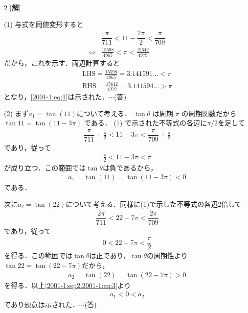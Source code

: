 \documentclass[../../main.tex]{subfiles}
\begin{document}
\setcounter{equation}{0}
\setcounter{figure}{0}
\setcounter{table}{0}
\begin{oframed}
  
\end{oframed}
\setlength{\columnseprule}{0.4pt}
\begin{multicols}{2}
  {\bf[解]}

  (1) 与式を同値変形すると
  \begin{align}
     & \dfrac{\pi}{711} < 11 - \dfrac{7\pi}{2} < \dfrac{\pi}{709} \nonumber \\
    \iff
     & \frac{15598}{4965} < \pi < \frac{15642}{4979}\label{2001-1:eq:1}
  \end{align}
  だから，これを示す．両辺計算すると
  \begin{align*}
    \mathrm{LHS} = \frac{15598}{4965} = 3.141591... < \pi \\
    \mathrm{RHS} = \frac{15642}{4979} = 3.141594... > \pi
  \end{align*}
  となり，\cref{2001-1:eq:1}は示された．$\cdots$(答)


  \vspace{10pt}
  (2)
  まず$a_1=\tan(11)$について考える．
  $\tan \theta$ は周期 $\pi$ の周期関数だから $\tan 11 = \tan (11-3\pi)$ である．
  (1) で示された不等式の各辺に$\pi/2$を足して
  \begin{align*}
    \dfrac{\pi}{711} + \frac{\pi}{2} < 11 - 3\pi < \dfrac{\pi}{709} + \frac{\pi}{2}
  \end{align*}
  であり，従って
  \begin{align*}
    \frac{\pi}{2} < 11 - 3\pi < \pi
  \end{align*}
  が成り立つ．この範囲では$\tan\theta$は負であるから，
  \begin{align}
    a_1 = \tan(11) = \tan\left(11-3\pi\right) < 0 \label{2001-1:eq:2}
  \end{align}
  である．

  次に$a_2=\tan(22)$について考える．同様に(1)で示した不等式の各辺$2$倍して
  \begin{align*}
    \dfrac{2\pi}{711} < 22 - 7\pi < \dfrac{2\pi}{709}
  \end{align*}
  であり，従って
  \begin{align*}
    0 < 22 - 7\pi < \dfrac{\pi}{2}
  \end{align*}
  を得る．この範囲では$\tan\theta$は正であり，$\tan\theta$の周期性より$\tan 22 = \tan (22-7\pi)$だから，
  \begin{align}
    a_2 = \tan(22) = \tan\left(22-7\pi\right) > 0 \label{2001-1:eq:3}
  \end{align}
  を得る．以上\cref{2001-1:eq:2,2001-1:eq:3}より
  \begin{align*}
    a_1 < 0 < a_2
  \end{align*}
  であり題意は示された．$\cdots$(答)


\end{multicols}
\end{document}
